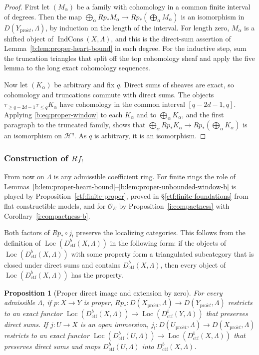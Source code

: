 \documentclass[11pt,a4paper]{article}
\numberwithin{equation}{section}
\newtheorem{proposition}[theorem]{Proposition}
\theoremstyle{definition}
\theoremstyle{remark}
\newcommand{\Loc}{\operatorname{Loc}}
\newcommand{\proet}{\mathrm{pro}\acute{e}t}
\newcommand{\IndCons}{\operatorname{IndCons}}
\newcommand{\Dctf}{D^b_{\mathrm{ctf}}}
\begin{document}
\begin{proof}
First let $(M_\alpha)$ be a family with cohomology in a common finite
interval of degrees. Then the map
$\bigoplus_\alpha Rp_*M_\alpha\to Rp_*(\bigoplus_\alpha M_\alpha)$ is an
isomorphism in $D(Y_{\proet},\Lambda)$, by induction on the length of the interval. For length zero,
$M_\alpha$ is a shifted object of $\IndCons(X,\Lambda)$, and this is the
direct-sum assertion of Lemma~\ref{b:lem:proper-heart-bound} in each
degree. For the inductive step, sum the truncation triangles that split
off the top cohomology sheaf and apply the five lemma to the long exact
cohomology sequences.

Now let $(K_\alpha)$ be arbitrary and fix $q$. Direct sums of sheaves are
exact, so cohomology and truncations commute with direct sums. The
objects $\tau_{\geq q-2d-1}\tau_{\leq q}K_\alpha$ have cohomology in the
common interval $[q-2d-1,q]$. Applying \eqref{b:eq:proper-window} to each
$K_\alpha$ and to $\bigoplus_\alpha K_\alpha$, and the first paragraph to
the truncated family, shows that
$\bigoplus_\alpha Rp_*K_\alpha\to Rp_*(\bigoplus_\alpha K_\alpha)$ is an
isomorphism on $\mathcal H^q$. As $q$ is arbitrary, it is an isomorphism.
\end{proof}

\subsubsection{Construction of \texorpdfstring{$Rf_!$}{Rf!}}

From now on $\Lambda$ is any admissible coefficient ring. For finite
rings the role of Lemmas~\ref{b:lem:proper-heart-bound}--\ref{b:lem:proper-unbounded-window-b}
is played by Proposition~\ref{ctf:finite-proper}, proved in
\S\ref{ctf:finite-foundations} from flat constructible models, and for
$\mathcal O_E$ by Proposition~\ref{i:compactness} with
Corollary~\ref{i:compactness-b}.

Both factors of $Rp_*\circ j_!$ preserve the localizing categories. This
follows from the definition of $\Loc(\Dctf(X,\Lambda))$ in the following
form: if the objects of $\Loc(\Dctf(X,\Lambda))$ with some property form
a triangulated subcategory that is closed under direct sums and contains
$\Dctf(X,\Lambda)$, then every object of $\Loc(\Dctf(X,\Lambda))$ has the
property.

\begin{proposition}[Proper direct image and extension by zero]
\label{b:prop:proper-image-localizing}
For every admissible $\Lambda$, if $p:X\to Y$ is proper,
$Rp_*\colon D(X_{\proet},\Lambda)\to D(Y_{\proet},\Lambda)$ restricts to an exact functor
$\Loc(\Dctf(X,\Lambda))\to\Loc(\Dctf(Y,\Lambda))$ that preserves direct
sums. If $j:U\to X$ is an open immersion,
$j_!\colon D(U_{\proet},\Lambda)\to D(X_{\proet},\Lambda)$ restricts to an exact
functor $\Loc(\Dctf(U,\Lambda))\to\Loc(\Dctf(X,\Lambda))$ that preserves
direct sums and maps $\Dctf(U,\Lambda)$ into $\Dctf(X,\Lambda)$.
\end{proposition}
\end{document}
